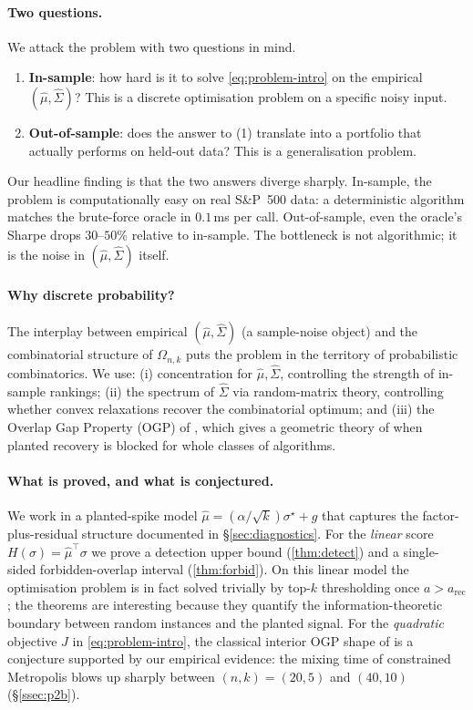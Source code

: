 \documentclass[11pt]{article}
\begin{document}
\paragraph{Two questions.} We attack the problem with two questions in mind.
\begin{enumerate}\itemsep=2pt
\item \textbf{In-sample}: how hard is it to solve \eqref{eq:problem-intro} on the empirical
$(\hat\mu,\hat\Sigma)$? This is a discrete optimisation problem on a specific noisy input.
\item \textbf{Out-of-sample}: does the answer to (1) translate into a portfolio that
actually performs on held-out data? This is a generalisation problem.
\end{enumerate}
Our headline finding is that the two answers diverge sharply. In-sample, the problem is
computationally easy on real S\&P~500 data: a deterministic algorithm matches the
brute-force oracle in $0.1$\,ms per call. Out-of-sample, even the oracle's Sharpe drops
$30$--$50\%$ relative to in-sample. The bottleneck is not algorithmic; it is the noise
in $(\hat\mu,\hat\Sigma)$ itself.

\paragraph{Why discrete probability?} The interplay between empirical
$(\hat\mu,\hat\Sigma)$ (a sample-noise object) and the combinatorial structure of
$\Omega_{n,k}$ puts the problem in the territory of probabilistic combinatorics. We use:
(i) concentration for $\hat\mu,\hat\Sigma$, controlling the strength of in-sample
rankings; (ii) the spectrum of $\hat\Sigma$ via random-matrix theory, controlling whether
convex relaxations recover the combinatorial optimum; and (iii) the Overlap Gap Property
(OGP) of \cite{gamarnik-zadik-clique,gamarnik-pnas}, which gives a geometric theory of
when planted recovery is blocked for whole classes of algorithms.

\paragraph{What is proved, and what is conjectured.} We work in a planted-spike model
$\hat\mu = (\alpha/\sqrt k)\sigma^\star + g$ that captures the
factor-plus-residual structure documented in \S\ref{sec:diagnostics}. For the
\emph{linear} score $H(\sigma)=\hat\mu^\top\sigma$ we prove a detection upper bound
(\cref{thm:detect}) and a single-sided forbidden-overlap interval (\cref{thm:forbid}).
On this linear model the optimisation problem is in fact solved trivially by top-$k$
thresholding once $a>a_{\mathrm{rec}}$; the theorems are interesting because they
quantify the information-theoretic boundary between random instances and the planted
signal. For the \emph{quadratic} objective $J$ in \eqref{eq:problem-intro}, the classical
interior OGP shape of \cite{gamarnik-zadik-clique} is a conjecture supported by our
empirical evidence: the mixing time of constrained Metropolis blows up sharply between
$(n,k)=(20,5)$ and $(40,10)$ (\S\ref{ssec:p2b}).
\end{document}
